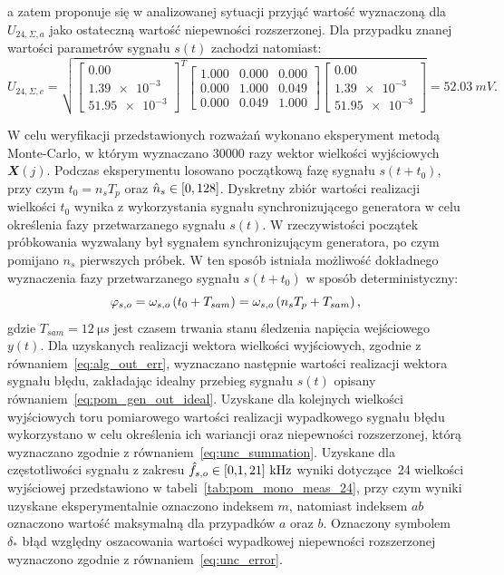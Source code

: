 a zatem proponuje się w analizowanej sytuacji przyjąć wartość wyznaczoną dla $U_{24,\Sigma,a}$ jako ostateczną wartość niepewności rozszerzonej. Dla przypadku znanej wartości parametrów sygnału $s(t)$ zachodzi natomiast:
\begin{equation}
U_{24,\Sigma,c} = \sqrt{
\begin{bmatrix}
\num{0.00} \\ \num{1.39e-3} \\ \num{51.95e-3}
\end{bmatrix}^{T}
\begin{bmatrix}
\num{1.000} & \num{0.000} & \num{0.000} \\
\num{0.000} & \num{1.000} & \num{0.049} \\
\num{0.000} & \num{0.049} & \num{1.000}
\end{bmatrix}
\begin{bmatrix}
\num{0.00} \\ \num{1.39e-3} \\ \num{51.95e-3}
\end{bmatrix}} = \qty{52.03}{mV}
\label{eq:pom_mono_all_unc_c}.
\end{equation}

W celu weryfikacji przedstawionych rozważań wykonano eksperyment metodą Monte-Carlo, w którym wyznaczano \num{30000} razy wektor wielkości wyjściowych $\mathbfit{X}(j)$. Podczas eksperymentu losowano początkową fazę sygnału $s(t+t_{0})$, przy czym $t_{0} = n_{s} T_{p}$ oraz $\hat{n}_{s} \in \interval{0}{128}$. Dyskretny zbiór wartości realizacji wielkości $t_{0}$ wynika z wykorzystania sygnału synchronizującego generatora w celu określenia fazy przetwarzanego sygnału $s(t)$. W rzeczywistości początek próbkowania wyzwalany był sygnałem synchronizującym generatora, po czym pomijano $n_{s}$ pierwszych próbek. W ten sposób istniała możliwość dokładnego wyznaczenia fazy przetwarzanego sygnału $s(t+t_{0})$ w sposób deterministyczny:
\begin{equation}
\varphi_{s,o} = \omega_{s,o} \left(t_{0} + T_{sam}\right) = \omega_{s,o} \left(n_{s} T_{p} + T_{sam}\right) \label{eq:pom_mono_delay},
\end{equation}
gdzie $T_{sam} = \qty{12}{\micro s}$ jest czasem trwania stanu śledzenia napięcia wejściowego $y(t)$. Dla uzyskanych realizacji wektora wielkości wyjściowych, zgodnie z równaniem~\eqref{eq:alg_out_err}, wyznaczano następnie wartości realizacji wektora sygnału błędu, zakładając idealny przebieg sygnału $s(t)$ opisany równaniem~\eqref{eq:pom_gen_out_ideal}. Uzyskane dla kolejnych wielkości wyjściowych toru pomiarowego wartości realizacji wypadkowego sygnału błędu wykorzystano w celu określenia ich wariancji oraz niepewności rozszerzonej, którą wyznaczano zgodnie z równaniem~\eqref{eq:unc_summation}. Uzyskane dla częstotliwości sygnału z zakresu $\hat{f}_{s,o} \in \interval{\num{0.1}}{\num{21}}~\unit{kHz}$ wyniki dotyczące~\qty{24}{\numTej} wielkości wyjściowej przedstawiono w tabeli~\ref{tab:pom_mono_meas_24}, przy czym wyniki uzyskane eksperymentalnie oznaczono indeksem $m$, natomiast indeksem $ab$ oznaczono wartość maksymalną dla przypadków $a$ oraz $b$. Oznaczony symbolem $\delta_{*}$ błąd względny oszacowania wartości wypadkowej niepewności rozszerzonej wyznaczono zgodnie z równaniem~\eqref{eq:unc_error}.


